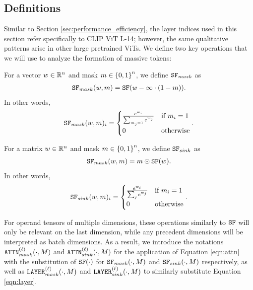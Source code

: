 \documentclass[10pt,twocolumn,letterpaper]{article}
\begin{document}
\subsection{Definitions}
\label{sec:definitions}
Similar to Section \ref{sec:performance_efficiency}, the layer indices used in this section refer specifically to CLIP ViT L-14; however, the same qualitative patterns arise in other large pretrained ViTs. We define two key operations that we will use to analyze the formation of massive tokens:
\begin{definition}[Masking]
    For a vector $w \in \R^n$ and mask $m \in \cb{0, 1}^n$, we define $\sfm$ as \begin{align}
        \sfm(w, m) = \sf(w - \infty \cdot (1 - m)).
    \end{align} In other words, \begin{align}
        \sfm(w, m)_i = \begin{cases}
            \frac{e^{w_i}}{\dss{m_j = 1}{} e^{w_j}}   & \text{if} \ m_i = 1  \\
            0   & \text{otherwise}
        \end{cases}.
    \end{align}
\end{definition}

\begin{definition}[Sinking]
    For a matrix $w \in \R^n$ and mask $m \in \cb{0, 1}^n$, we define $\sfs$ as \begin{align}
        \sfm(w, m) = m \odot \sf(w).
    \end{align} In other words, \begin{align}
        \sfs(w, m)_i = \begin{cases}
            \frac{e^{w_i}}{\dss{j}{} e^{w_j}}   & \text{if} \ m_i = 1  \\
            0   & \text{otherwise}
        \end{cases}.
    \end{align}
\end{definition}

For operand tensors of multiple dimensions, these operations similarly to $\sf$ will only be relevant on the last dimension, while any precedent dimensions will be interpreted as batch dimensions. As a result, we introduce the notations $\attnm{\ell}(\cdot, M)$ and $\attns{\ell}(\cdot, M)$ for the application of Equation \ref{eqn:attn} with the substitution of $\sf(\cdot)$ for $\sfm(\cdot, M)$ and $ \sfs(\cdot, M)$ respectively, as well as $\lyrm{\ell}(\cdot, M)$ and $\lyrs{\ell}(\cdot, M)$ to similarly substitute Equation \ref{eqn:layer}. \\
\end{document}
